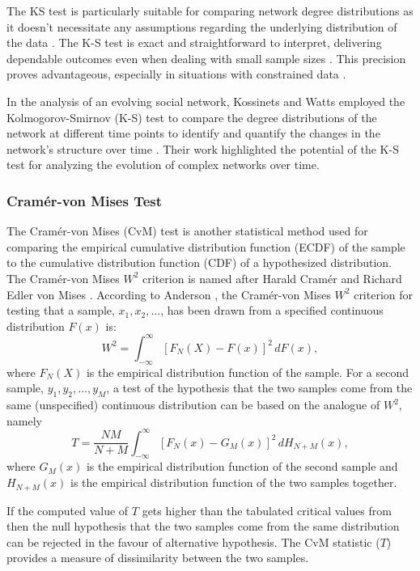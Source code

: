 \documentclass[conference]{IEEEtran} %
\begin{document}
The KS test is particularly suitable for comparing network degree distributions as it doesn't necessitate any assumptions regarding the underlying distribution of the data \cite{clauset2009power, ksdegree2014}. The K-S test is exact and straightforward to interpret, delivering dependable outcomes even when dealing with small sample sizes \cite{EngineeringStatisticsHandbook}. This precision proves advantageous, especially in situations with constrained data \cite{kossinets2006empirical, newman2010networks}.

In the analysis of an evolving social network, Kossinets and Watts employed the Kolmogorov-Smirnov (K-S) test to compare the degree distributions of the network at different time points to identify and quantify the changes in the network's structure over time \cite{kossinets2006empirical}. Their work highlighted the potential of the K-S test for analyzing the evolution of complex networks over time. 

\subsubsection{Cramér-von Mises Test}

The Cramér-von Mises (CvM) test is another statistical method used for comparing the empirical cumulative distribution function (ECDF) of the sample to the cumulative distribution function (CDF) of a hypothesized distribution. The Cramér-von Mises $W^2$ criterion is named after Harald Cramér \cite{cramer1928composition} and Richard Edler von Mises \cite{vonmises1928wahrscheinlichkeit}. According to Anderson \cite{anderson1962distribution}, the Cramér-von Mises $W^2$ criterion for testing that a sample, $x_1, x_2, \ldots$, has been drawn from a specified continuous distribution $F(x)$ is:
\[
W^2 = \int_{-\infty}^{\infty} [F_N(X) - F(x)]^2 \, dF(x),
\]
where $F_N(X)$ is the empirical distribution function of the sample. For a second sample, $y_1, y_2, \ldots, y_M$, a test of the hypothesis that the two samples come from the same (unspecified) continuous distribution can be based on the analogue of $W^2$, namely
\[
T = \frac{NM}{N + M} \int_{-\infty}^{\infty} [F_N(x) - G_M(x)]^2 \, dH_{N+M}(x),
\]
where $G_M(x)$ is the empirical distribution function of the second sample and $H_{N+M}(x)$ is the empirical distribution function of the two samples together.

If the computed value of $T$ gets higher than the tabulated critical values from \cite{anderson1962distribution} then the null hypothesis that the two samples come from the same distribution can be rejected in the favour of alternative hypothesis. The CvM statistic ($T$) provides a measure of dissimilarity between the two samples.
\end{document}
